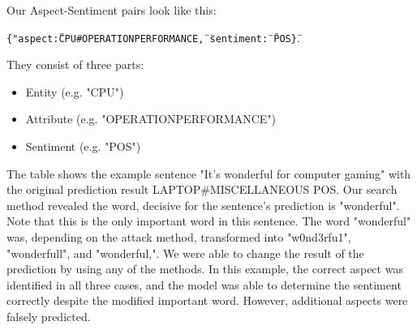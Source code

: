 Our Aspect-Sentiment pairs look like this:


\texttt{\{"aspect\":\"CPU\#OPERATION\textunderscore PERFORMANCE\", \"sentiment\": \"POS\"\}}.

They consist of three parts:
\begin{itemize}
\item Entity (e.g. "CPU")
\item Attribute (e.g. "OPERATION\textunderscore PERFORMANCE")
\item Sentiment (e.g. "POS")
\end{itemize}

The table shows the example sentence "It's wonderful for computer gaming" with the original prediction result LAPTOP\#MISCELLANEOUS POS. Our search method revealed the word, decisive for the sentence's prediction is "wonderful". Note that this is the only important word in this sentence. The word "wonderful" was, depending on the attack method, transformed into "w0nd3rfu1", "wonderfull", and "wonderful,". We were able to change the result of the prediction by using any of the methods. In this example, the correct aspect was identified in all three cases, and the model was able to determine the sentiment correctly despite the modified important word. However, additional aspects were falsely predicted. 

